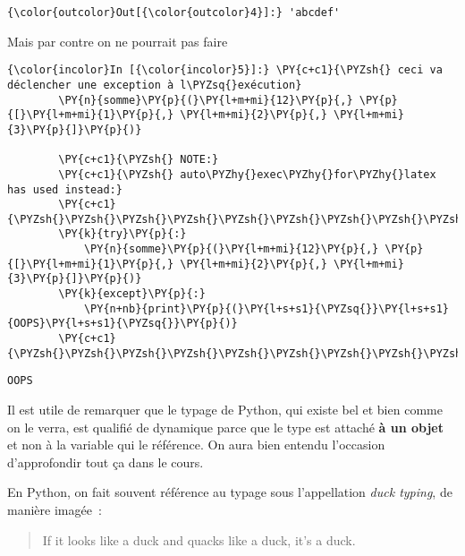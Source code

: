 \begin{Verbatim}[commandchars=\\\{\},frame=single,framerule=0.3mm,rulecolor=\color{cellframecolor}]
{\color{outcolor}Out[{\color{outcolor}4}]:} 'abcdef'
\end{Verbatim}
            
    Mais par contre on ne pourrait pas faire

    \begin{Verbatim}[commandchars=\\\{\},frame=single,framerule=0.3mm,rulecolor=\color{cellframecolor}]
{\color{incolor}In [{\color{incolor}5}]:} \PY{c+c1}{\PYZsh{} ceci va déclencher une exception à l\PYZsq{}exécution}
        \PY{n}{somme}\PY{p}{(}\PY{l+m+mi}{12}\PY{p}{,} \PY{p}{[}\PY{l+m+mi}{1}\PY{p}{,} \PY{l+m+mi}{2}\PY{p}{,} \PY{l+m+mi}{3}\PY{p}{]}\PY{p}{)}
        
        \PY{c+c1}{\PYZsh{} NOTE:}
        \PY{c+c1}{\PYZsh{} auto\PYZhy{}exec\PYZhy{}for\PYZhy{}latex has used instead:}
        \PY{c+c1}{\PYZsh{}\PYZsh{}\PYZsh{}\PYZsh{}\PYZsh{}\PYZsh{}\PYZsh{}\PYZsh{}\PYZsh{}\PYZsh{}}
        \PY{k}{try}\PY{p}{:}
            \PY{n}{somme}\PY{p}{(}\PY{l+m+mi}{12}\PY{p}{,} \PY{p}{[}\PY{l+m+mi}{1}\PY{p}{,} \PY{l+m+mi}{2}\PY{p}{,} \PY{l+m+mi}{3}\PY{p}{]}\PY{p}{)}
        \PY{k}{except}\PY{p}{:}
            \PY{n+nb}{print}\PY{p}{(}\PY{l+s+s1}{\PYZsq{}}\PY{l+s+s1}{OOPS}\PY{l+s+s1}{\PYZsq{}}\PY{p}{)}
        \PY{c+c1}{\PYZsh{}\PYZsh{}\PYZsh{}\PYZsh{}\PYZsh{}\PYZsh{}\PYZsh{}\PYZsh{}\PYZsh{}\PYZsh{}}
\end{Verbatim}


    \begin{Verbatim}[commandchars=\\\{\},frame=single,framerule=0.3mm,rulecolor=\color{cellframecolor}]
OOPS
\end{Verbatim}

    Il est utile de remarquer que le typage de Python, qui existe bel et
bien comme on le verra, est qualifié de dynamique parce que le type est
attaché \textbf{à un objet} et non à la variable qui le référence. On
aura bien entendu l'occasion d'approfondir tout ça dans le cours.

    En Python, on fait souvent référence au typage sous l'appellation
\emph{duck typing}, de manière imagée~:

\begin{quote}
If it looks like a duck and quacks like a duck, it's a duck.
\end{quote}

